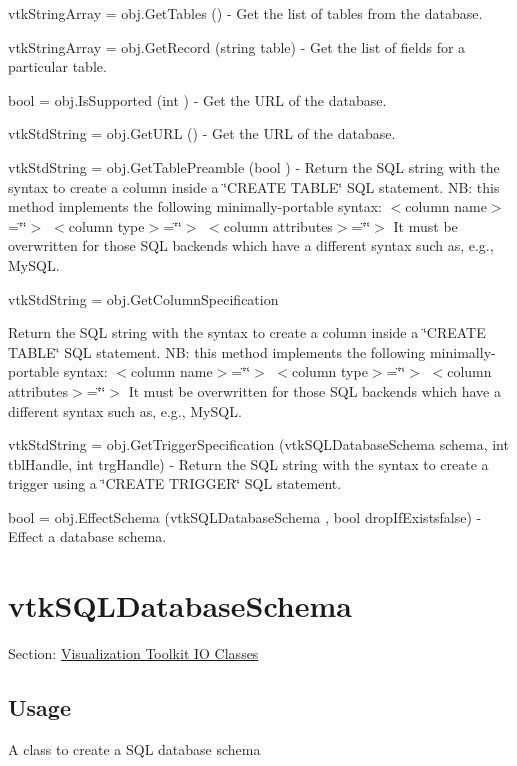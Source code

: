 \begin{DoxyItemize}
\item {\ttfamily vtk\-String\-Array = obj.\-Get\-Tables ()} -\/ Get the list of tables from the database.  
\item {\ttfamily vtk\-String\-Array = obj.\-Get\-Record (string table)} -\/ Get the list of fields for a particular table.  
\item {\ttfamily bool = obj.\-Is\-Supported (int )} -\/ Get the U\-R\-L of the database.  
\item {\ttfamily vtk\-Std\-String = obj.\-Get\-U\-R\-L ()} -\/ Get the U\-R\-L of the database.  
\item {\ttfamily vtk\-Std\-String = obj.\-Get\-Table\-Preamble (bool )} -\/ Return the S\-Q\-L string with the syntax to create a column inside a \char`\"{}\-C\-R\-E\-A\-T\-E T\-A\-B\-L\-E\char`\"{} S\-Q\-L statement. N\-B\-: this method implements the following minimally-\/portable syntax\-: $<$column name$>$=\char`\"{}\char`\"{}$>$ $<$column type$>$=\char`\"{}\char`\"{}$>$ $<$column attributes$>$=\char`\"{}\char`\"{}$>$ It must be overwritten for those S\-Q\-L backends which have a different syntax such as, e.\-g., My\-S\-Q\-L.  
\item {\ttfamily  vtk\-Std\-String = obj.\-Get\-Column\-Specification }
\begin{DoxyItemize}
\item Return the S\-Q\-L string with the syntax to create a column inside a \char`\"{}\-C\-R\-E\-A\-T\-E T\-A\-B\-L\-E\char`\"{} S\-Q\-L statement. N\-B\-: this method implements the following minimally-\/portable syntax\-: $<$column name$>$=\char`\"{}\char`\"{}$>$ $<$column type$>$=\char`\"{}\char`\"{}$>$ $<$column attributes$>$=\char`\"{}\char`\"{}$>$ It must be overwritten for those S\-Q\-L backends which have a different syntax such as, e.\-g., My\-S\-Q\-L.  
\end{DoxyItemize}
\item {\ttfamily vtk\-Std\-String = obj.\-Get\-Trigger\-Specification (vtk\-S\-Q\-L\-Database\-Schema schema, int tbl\-Handle, int trg\-Handle)} -\/ Return the S\-Q\-L string with the syntax to create a trigger using a \char`\"{}\-C\-R\-E\-A\-T\-E T\-R\-I\-G\-G\-E\-R\char`\"{} S\-Q\-L statement.  
\item {\ttfamily bool = obj.\-Effect\-Schema (vtk\-S\-Q\-L\-Database\-Schema , bool drop\-If\-Existsfalse)} -\/ Effect a database schema.  
\end{DoxyItemize}\hypertarget{vtkio_vtksqldatabaseschema}{}\section{vtk\-S\-Q\-L\-Database\-Schema}\label{vtkio_vtksqldatabaseschema}
Section\-: \hyperlink{sec_vtkio}{Visualization Toolkit I\-O Classes} \hypertarget{vtkwidgets_vtkxyplotwidget_Usage}{}\subsection{Usage}\label{vtkwidgets_vtkxyplotwidget_Usage}
A class to create a S\-Q\-L database schema


